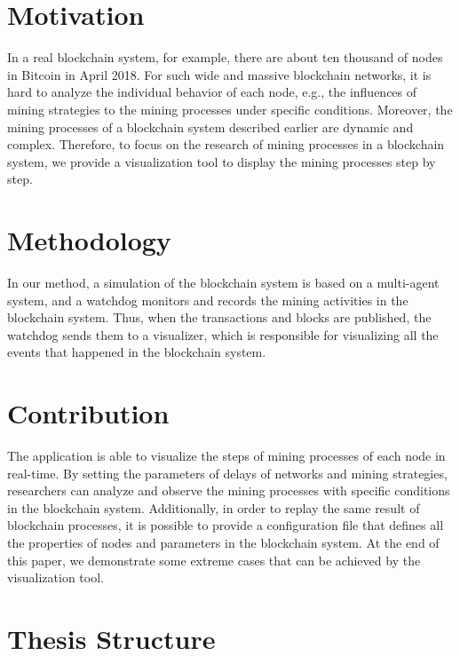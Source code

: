 \section{Motivation}

In a real blockchain system, for example, there are about ten thousand of nodes in Bitcoin in April 2018. For such wide and massive blockchain networks, it is hard to analyze the individual behavior of each node, e.g., the influences of mining strategies to the mining processes under specific conditions. Moreover, the mining processes of a blockchain system described earlier are dynamic and complex. Therefore, to focus on the research of mining processes in a blockchain system, we provide a visualization tool to display the mining processes step by step.

\section{Methodology}

In our method, a simulation of the blockchain system is based on a multi-agent system, and a watchdog monitors and records the mining activities in the blockchain system. Thus, when the transactions and blocks are published, the watchdog sends them to a visualizer, which is responsible for visualizing all the events that happened in the blockchain system. 

\section{Contribution}

The application is able to visualize the steps of mining processes of each node in real-time. By setting the parameters of delays of networks and mining strategies, researchers can analyze and observe the mining processes with specific conditions in the blockchain system. Additionally, in order to replay the same result of blockchain processes, it is possible to provide a configuration file that defines all the properties of nodes and parameters in the blockchain system. At the end of this paper, we demonstrate some extreme cases that can be achieved by the visualization tool.

\section{Thesis Structure}

